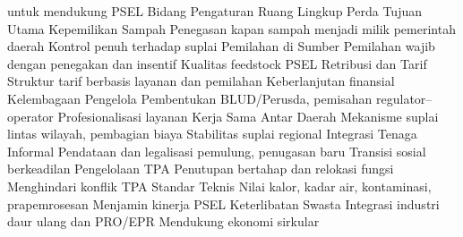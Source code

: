 \documentclass[
  letterpaper,
  DIV=11,
  numbers=noendperiod]{scrreprt}
\begin{document}
untuk mendukung PSEL Bidang Pengaturan Ruang Lingkup Perda Tujuan Utama
Kepemilikan Sampah Penegasan kapan sampah menjadi milik pemerintah
daerah Kontrol penuh terhadap suplai Pemilahan di Sumber Pemilahan wajib
dengan penegakan dan insentif Kualitas feedstock PSEL Retribusi dan
Tarif Struktur tarif berbasis layanan dan pemilahan Keberlanjutan
finansial Kelembagaan Pengelola Pembentukan BLUD/Perusda, pemisahan
regulator--operator Profesionalisasi layanan Kerja Sama Antar Daerah
Mekanisme suplai lintas wilayah, pembagian biaya Stabilitas suplai
regional Integrasi Tenaga Informal Pendataan dan legalisasi pemulung,
penugasan baru Transisi sosial berkeadilan Pengelolaan TPA Penutupan
bertahap dan relokasi fungsi Menghindari konflik TPA Standar Teknis
Nilai kalor, kadar air, kontaminasi, prapemrosesan Menjamin kinerja PSEL
Keterlibatan Swasta Integrasi industri daur ulang dan PRO/EPR Mendukung
ekonomi sirkular
\end{document}
